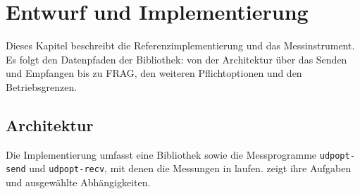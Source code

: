 
\chapter{Entwurf und Implementierung}
\label{chap:entwurf}

Dieses Kapitel beschreibt die Referenzimplementierung und das Messinstrument. Es folgt den Datenpfaden
der Bibliothek: von der Architektur über das Senden und Empfangen bis zu FRAG, den weiteren
Pflichtoptionen und den Betriebsgrenzen.

\section{Architektur}
\label{sec:architektur}

Die Implementierung umfasst eine Bibliothek sowie die Messprogramme \texttt{udpopt-send} und
\texttt{udpopt-recv}, mit denen die Messungen in  laufen. 
zeigt ihre Aufgaben und ausgewählte Abhängigkeiten.

